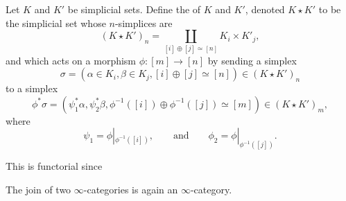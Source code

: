 \documentclass[main.tex]{subfiles}
\begin{document}
\begin{definition}
  \label{def:join_of_simplicial_sets}
  Let $K$ and $K'$ be simplicial sets. Define the  of $K$ and $K'$, denoted $K \star K'$ to be the simplicial set whose $n$-simplices are
  \begin{equation*}
    (K \star K')_{n} = \coprod_{[i] \oplus [j] \simeq [n]} K_{i} \times K'_{j},
  \end{equation*}
  and which acts on a morphism $\phi\colon [m] \to [n]$ by sending a simplex
  \begin{equation*}
    \sigma = (\alpha \in K_{i}, \beta \in K_{j}, [i] \oplus [j] \simeq [n]) \in (K \star K')_{n}
  \end{equation*}
  to a simplex
  \begin{equation*}
    \phi^{*}\sigma = (\psi^{*}_{1} \alpha, \psi^{*}_{2} \beta, \phi^{-1}([i]) \oplus \phi^{-1}([j]) \simeq [m]) \in (K \star K')_{m},
  \end{equation*}
  where
  \begin{equation*}
    \psi_{1} = \phi|_{\phi^{-1}([i])},\qquad\text{and}\qquad \phi_{2} = \phi|_{\phi^{-1}([j])}.
  \end{equation*}

  This is functorial since
\end{definition}

\begin{proposition}
  The join of two $\infty$-categories is again an $\infty$-category.
\end{proposition}
\end{document}
